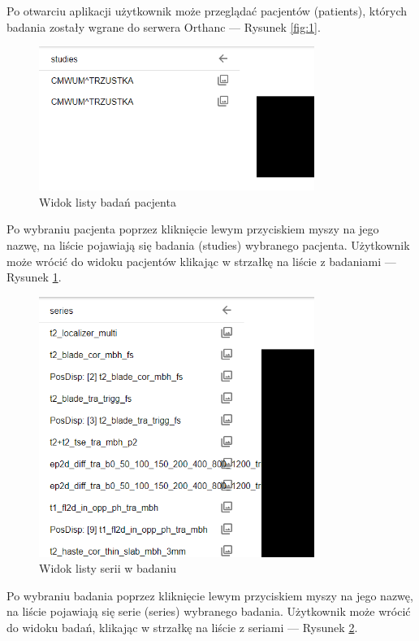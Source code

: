 \documentclass[a4paper,11pt,twoside,openright]{report}
\theoremstyle{definition}
\begin{document}
Po otwarciu aplikacji użytkownik może przeglądać pacjentów (patients), których
badania zostały wgrane do serwera Orthanc --- Rysunek \ref{fig:1}.

\pagebreak


\begin{figure}[h!]
	\center
	\includegraphics[width=0.8\textwidth]{2}
	\caption{Widok listy badań pacjenta}
    	\label{fig:2}
\end{figure}

Po wybraniu pacjenta poprzez kliknięcie lewym przyciskiem myszy na jego nazwę,
na liście pojawiają się badania (studies) wybranego pacjenta. Użytkownik może
wrócić do widoku pacjentów klikając w strzałkę na liście z badaniami --- Rysunek \ref{fig:2}.

\pagebreak

\begin{figure}[h!]
	\center
	\includegraphics[width=0.8\textwidth]{3}
	\caption{Widok listy serii w badaniu}
    	\label{fig:3}
\end{figure}

Po wybraniu badania poprzez kliknięcie lewym przyciskiem myszy na jego nazwę,
na liście pojawiają się serie (series) wybranego badania. Użytkownik może wrócić
do widoku badań, klikając w strzałkę na liście z seriami --- Rysunek \ref{fig:3}.
\end{document}
